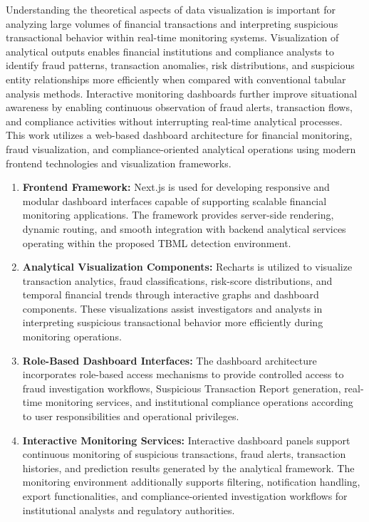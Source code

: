 Understanding the theoretical aspects of data visualization is important for analyzing large volumes of financial transactions and interpreting suspicious transactional behavior within real-time monitoring systems. Visualization of analytical outputs enables financial institutions and compliance analysts to identify fraud patterns, transaction anomalies, risk distributions, and suspicious entity relationships more efficiently when compared with conventional tabular analysis methods. Interactive monitoring dashboards further improve situational awareness by enabling continuous observation of fraud alerts, transaction flows, and compliance activities without interrupting real-time analytical processes.
This work utilizes a web-based dashboard architecture for financial monitoring, fraud visualization, and compliance-oriented analytical operations using modern frontend technologies and visualization frameworks.

{%
\renewcommand{\theenumi}{\roman{enumi}}%
\renewcommand{\labelenumi}{(\theenumi)}%
\begin{enumerate}
    \item \textbf{Frontend Framework:}
        Next.js is used for developing responsive and modular dashboard interfaces capable of supporting scalable financial monitoring applications. The framework provides server-side rendering, dynamic routing, and smooth integration with backend analytical services operating within the proposed TBML detection environment.

    \item \textbf{Analytical Visualization Components:}
        Recharts is utilized to visualize transaction analytics, fraud classifications, risk-score distributions, and temporal financial trends through interactive graphs and dashboard components. These visualizations assist investigators and analysts in interpreting suspicious transactional behavior more efficiently during monitoring operations.

    \item \textbf{Role-Based Dashboard Interfaces:}
        The dashboard architecture incorporates role-based access mechanisms to provide controlled access to fraud investigation workflows, Suspicious Transaction Report generation, real-time monitoring services, and institutional compliance operations according to user responsibilities and operational privileges.

    \item \textbf{Interactive Monitoring Services:}
        Interactive dashboard panels support continuous monitoring of suspicious transactions, fraud alerts, transaction histories, and prediction results generated by the analytical framework. The monitoring environment additionally supports filtering, notification handling, export functionalities, and compliance-oriented investigation workflows for institutional analysts and regulatory authorities.
\end{enumerate}%
}

